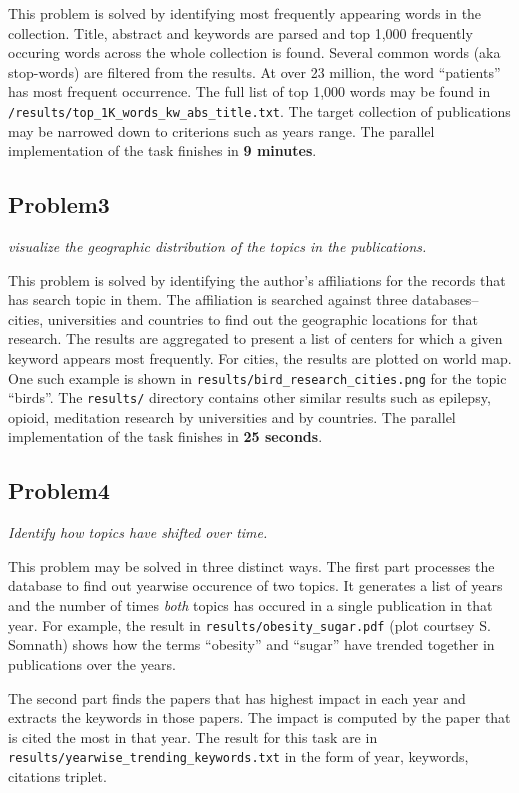 \documentclass{article}
\begin{document}
This problem is solved by identifying most frequently appearing words in the
collection. Title, abstract and keywords are parsed and top 1,000 frequently
occuring words across the whole collection is found. Several common words (aka
stop-words) are filtered from the results. At over 23 million, the word
``patients'' has most frequent occurrence. The full list of top 1,000 words
may be found in \texttt{/results/top\_1K\_words\_kw\_abs\_title.txt}. The
target collection of publications may be narrowed down to criterions such as
years range.  The parallel implementation of the task finishes in \textbf{9
minutes}.

\subsection*{Problem3}
\textit{visualize the geographic distribution of the topics in the publications.}

This problem is solved by identifying the author's affiliations for the records
that has search topic in them. The affiliation is searched against
three databases--cities, universities and countries to find out the geographic
locations for that research. The results are aggregated to present a list of
centers for which a given keyword appears most frequently. For cities, the
results are plotted on world map. One such example is shown in
\texttt{results/bird\_research\_cities.png} for the topic ``birds''. The \texttt{results/}
directory contains other similar results such as epilepsy, opioid,
meditation research by universities and by countries. The parallel
implementation of the task finishes in \textbf{25 seconds}.

\subsection*{Problem4}
\textit{Identify how topics have shifted over time.}

This problem may be solved in three distinct ways. The first part processes the
database to find out yearwise occurence of two topics. It generates a
list of years and the number of times \textit{both} topics has occured in a
single publication in that year. For example, the result in
\texttt{results/obesity\_sugar.pdf} (plot courtsey S.  Somnath) shows how the
terms ``obesity'' and ``sugar'' have trended together in publications over the
years.

The second part finds the papers that has highest impact in each year and
extracts the keywords in those papers. The impact is computed by the paper that
is cited the most in that year. The result for this task are in
\texttt{results/yearwise\_trending\_keywords.txt} in the form of year,
keywords, citations triplet.
\end{document}
